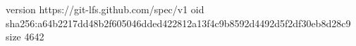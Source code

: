 version https://git-lfs.github.com/spec/v1
oid sha256:a64b2217dd48b2f605046dded422812a13f4c9b8592d4492d5f2df30eb8d28c9
size 4642
